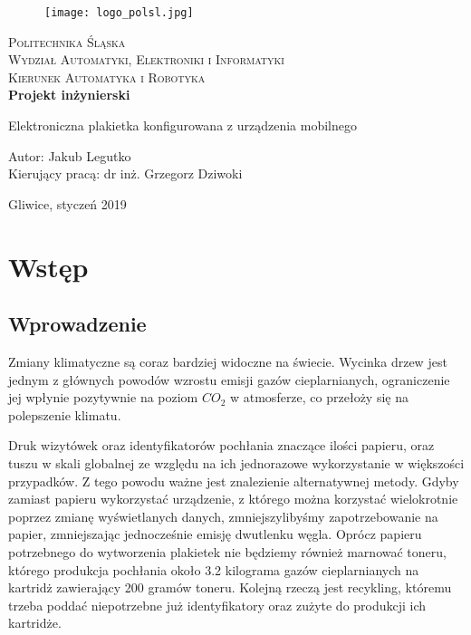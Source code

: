 \documentclass[a4paper,12pt, twoside]{article}
\begin{document}
	\newpage
	\thispagestyle{empty}
	\begin{center}
		
		\begin{figure}
			\centering
			\texttt{[image: logo\_polsl.jpg]}
			\vspace{.5cm}
		\end{figure}
		
		{\fontsize{17}{17}\selectfont
			\textsc{Politechnika Śląska \\[.3cm]
				Wydział Automatyki, Elektroniki i Informatyki  \\[.3cm]
				Kierunek Automatyka i Robotyka  \\[1.5cm]}
			\textbf{Projekt inżynierski \\[0.7cm]}}
		
		\Large
		{Elektroniczna plakietka konfigurowana z urządzenia mobilnego \\[4cm]}
		\Large{\begin{flushleft}
				Autor: Jakub Legutko\\
				Kierujący pracą: dr inż. Grzegorz Dziwoki\\[0.3cm]
		\end{flushleft}}
		
		\normalsize
		\vfill Gliwice, styczeń 2019
	\end{center}
	\newpage
	\newpage
	\thispagestyle{empty}
	\tableofcontents
	\newpage
	\newpage
	\clearpage
	\setcounter{page}{1}
	\section{Wstęp}
	
	\subsection{Wprowadzenie}
	Zmiany klimatyczne są coraz bardziej widoczne na świecie. Wycinka drzew jest jednym z głównych powodów wzrostu emisji gazów cieplarnianych\cite{clima_causes}, ograniczenie jej wpłynie pozytywnie na poziom ${CO_{2}}$ w atmosferze, co przełoży się na polepszenie klimatu. 
	
	Druk wizytówek oraz identyfikatorów pochłania znaczące ilości papieru, oraz tuszu w skali globalnej ze względu na ich jednorazowe wykorzystanie w większości przypadków. Z tego powodu ważne jest znalezienie alternatywnej metody. Gdyby zamiast papieru wykorzystać urządzenie, z którego można korzystać wielokrotnie poprzez zmianę wyświetlanych danych, zmniejszylibyśmy zapotrzebowanie na papier, zmniejszając jednocześnie emisję dwutlenku węgla. Oprócz papieru potrzebnego do wytworzenia plakietek nie będziemy również marnować toneru, którego produkcja pochłania około 3.2 kilograma gazów cieplarnianych\cite{cartidge_production} na kartridż zawierający 200 gramów toneru. Kolejną rzeczą jest recykling, któremu trzeba poddać niepotrzebne już identyfikatory oraz zużyte do produkcji ich kartridże.
	
\end{document}
